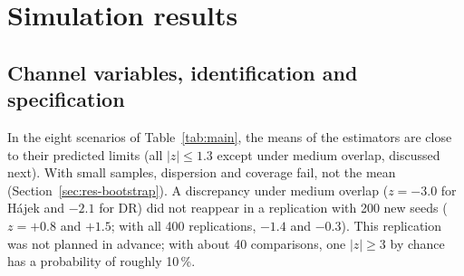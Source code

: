 \section{Simulation results}\label{sec:results}

\subsection{Channel variables, identification and specification}\label{sec:res-main}

In the eight scenarios of Table~\ref{tab:main}, the means of the estimators are close to their predicted limits (all $|z|\le1.3$ except under medium overlap, discussed next). With small samples, dispersion and coverage fail, not the mean (Section~\ref{sec:res-bootstrap}). A discrepancy under medium overlap ($z=-3.0$ for Hájek and $-2.1$ for DR) did not reappear in a replication with 200 new seeds ($z=+0.8$ and $+1.5$; with all 400 replications, $-1.4$ and $-0.3$). This replication was not planned in advance; with about 40 comparisons, one $|z|\ge3$ by chance has a probability of roughly 10\,\%.

\begin{table}[ht]
\centering\small
\caption{Main results. Rates in \%; in parentheses, $z=$ (mean $-$ prediction)/(Monte Carlo error). SD: standard deviation of the DR estimator across replications. Coverage of the DR Wald interval at 95\,\%, with respect to $\theta$. In the scenarios with $C$, the theoretical $\neff/n_0$ is computed with the supported part; it is practically the same as without $C$ (0.217), because $\PP(H=0\mid V,D=1)$ varies little on the target region.}\label{tab:main}
\end{table}

